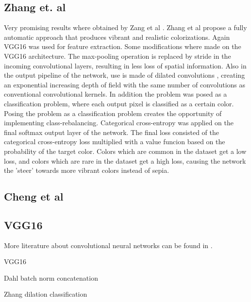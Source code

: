\subsection{Zhang et. al}
Very promising results where obtained by Zang et al \cite{Zhang}. Zhang et al propose a fully
automatic approach that produces vibrant and realistic colorizations. Again VGG16 was used for feature extraction. Some modifications where made on the VGG16 architecture. The max-pooling operation is replaced by stride in the incoming convolutional layers, resulting in less loss of spatial information. Also in the output pipeline of the network, use is made of dilated convolutions \cite{yu2015multi}, creating an exponential increasing depth of field with the same number of convolutions as conventional convolutional kernels. In addition the problem was posed as a classification problem, where each output pixel is classified as a certain color. Posing the problem as a classification problem creates the opportunity of implementing class-rebalancing. Categorical cross-entropy was applied on the final softmax output layer of the network. The final loss consisted of the categorical cross-entropy loss multiplied with a value funcion based on the probability of the target color. Colors which are common in the dataset get a low loss, and colors which are rare in the dataset get a high loss, causing the network the 'steer' towards more vibrant colors instead of sepia. 




\subsection{Cheng et al}

\subsection{VGG16}




More literature about convolutional neural networks can be found in \cite{GoodfellowBOOK}. 


%

VGG16




Dahl
batch norm
concatenation




Zhang
dilation
classification


